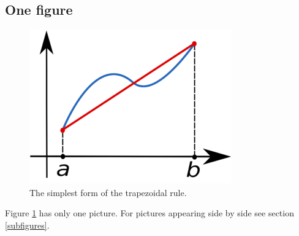 \documentclass[12pt,a4paper]{article}
\begin{document}
\subsection{One figure}
\begin{figure}[h!]
\centering
\includegraphics[scale=0.5]{trapez1.png}
\caption{The simplest form of the trapezoidal rule.}
\label{fig:simple_trapez}
\end{figure}
Figure \ref{fig:simple_trapez} has only one picture. For pictures appearing side by side see section \ref{subfigures}.
\end{document}
